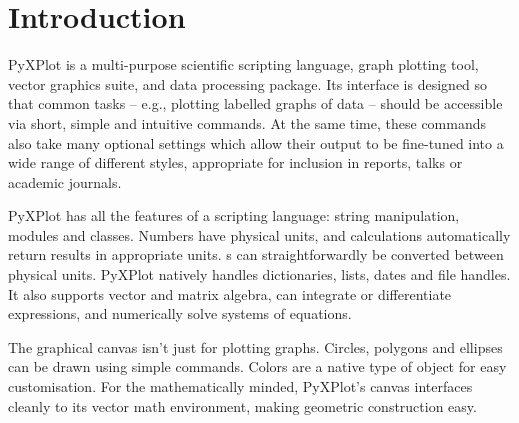 %
%
%
%
%



\chapter{Introduction}

\label{ch:introduction}

{\sc PyXPlot} is a multi-purpose scientific scripting language, graph plotting
tool, vector graphics suite, and data processing package.  Its interface is
designed so that common tasks -- e.g., plotting labelled graphs of data --
should be accessible via short, simple and intuitive commands. At the same
time, these commands also take many optional settings which allow their output
to be fine-tuned into a wide range of different styles, appropriate for
inclusion in reports, talks or academic journals.


PyXPlot has all the features of a scripting language: string manipulation,
modules and classes. Numbers have physical units, and calculations
automatically return results in appropriate units. \Datafile s can
straightforwardly be converted between physical units. PyXPlot natively handles
dictionaries, lists, dates and file handles. It also supports vector and matrix
algebra, can integrate or differentiate expressions, and numerically solve
systems of equations.


The graphical canvas isn't just for plotting graphs. Circles, polygons and
ellipses can be drawn using simple commands. Colors are a native type of object
for easy customisation. For the mathematically minded, PyXPlot's canvas
interfaces cleanly to its vector math environment, making geometric
construction easy.

